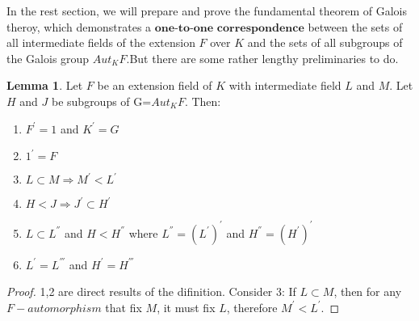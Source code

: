 \documentclass[a4paper, 11pt]{article}
\theoremstyle{remark}
\theoremstyle{definition}
\newtheorem{lemma}[theorem]{Lemma}
\begin{document}
    \vspace{0.5cm}
    In the rest section, we will prepare and prove the fundamental theorem of Galois
    theroy, which demonstrates a $\textbf{one-to-one correspondence}$ between the sets of all intermediate
    fields of the extension $F$ over $K$ and the sets of all subgroups of the Galois group
    $Aut_KF$.But there are some rather lengthy preliminaries to do.
    \vspace{0.5cm}

    \begin{lemma}
        Let $F$ be an extension field of $K$ with intermediate field $L$ and $M$. Let $H$ and $J$ be
        subgroups of G=$Aut_KF$. Then:
        \begin{enumerate}
                \item $F^{'}=1$ and $K^{'}=G$ 
                \item $1^{'}=F $
                \item $L\subset M \Rightarrow M^{'}<L^{'}$
                \item $H<J\Rightarrow J^{'}\subset H^{'}$
                \item $L\subset L^{''}$ and $H < H^{''}$ where $L^{''}=(L^{'})^{'}$ and $H^{''}=(H^{'})^{'} $
                \item $L^{'}=L^{'''}$ and $H^{'}=H^{'''}$
        \end{enumerate}                    
    \end{lemma}
    \vspace{0.3cm}
    \begin{proof}
        1,2 are direct results of the difinition. Consider 3: If $L\subset M$, then 
        for any $F-automorphism$ that fix $M$, it must fix $L$, therefore $M^{'}< L^{'}$.
    \end{proof}
\end{document}
